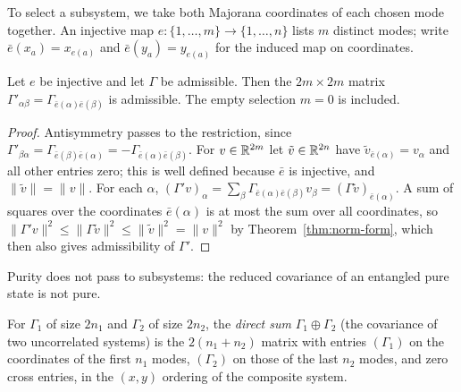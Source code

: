 To select a subsystem, we take both Majorana coordinates of each chosen mode
together. An injective map $e:\{1,\ldots,m\}\to\{1,\ldots,n\}$ lists $m$ distinct
modes; write $\bar e(x_a)=x_{e(a)}$ and $\bar e(y_a)=y_{e(a)}$ for the induced map on
coordinates.

\begin{theorem}\label{thm:subsystem}
Let $e$ be injective and let $\Gamma$ be admissible. Then the $2m\times2m$ matrix
$\Gamma'_{\alpha\beta}=\Gamma_{\bar e(\alpha)\bar e(\beta)}$ is admissible. The empty
selection $m=0$ is included.
\end{theorem}
\begin{proof}
Antisymmetry passes to the restriction, since
$\Gamma'_{\beta\alpha}=\Gamma_{\bar e(\beta)\bar e(\alpha)}=-\Gamma_{\bar e(\alpha)\bar e(\beta)}$.
For $v\in\mathbb R^{2m}$ let $\tilde v\in\mathbb R^{2n}$ have $\tilde v_{\bar e(\alpha)}=v_\alpha$ and
all other entries zero; this is well defined because $\bar e$ is injective, and
$\|\tilde v\|=\|v\|$. For each $\alpha$,
$(\Gamma'v)_\alpha=\sum_\beta\Gamma_{\bar e(\alpha)\bar e(\beta)}v_\beta=(\Gamma\tilde v)_{\bar e(\alpha)}$.
A sum of squares over the coordinates $\bar e(\alpha)$ is at most the sum over all
coordinates, so
$\|\Gamma'v\|^2\leq\|\Gamma\tilde v\|^2\leq\|\tilde v\|^2=\|v\|^2$ by
Theorem~\ref{thm:norm-form}, which then also gives admissibility of $\Gamma'$.
\end{proof}
\begin{remark}\label{rem:purity-subsystem}
Purity does not pass to subsystems: the reduced covariance of an entangled pure
state is not pure.
\end{remark}

For $\Gamma_1$ of size $2n_1$ and $\Gamma_2$ of size $2n_2$, the
\emph{direct sum} $\Gamma_1\oplus\Gamma_2$ (the covariance of two uncorrelated systems) is the $2(n_1+n_2)$ matrix with
entries $(\Gamma_1)$ on the coordinates of the first $n_1$ modes, $(\Gamma_2)$ on
those of the last $n_2$ modes, and zero cross entries, in the $(x,y)$ ordering of
the composite system.

